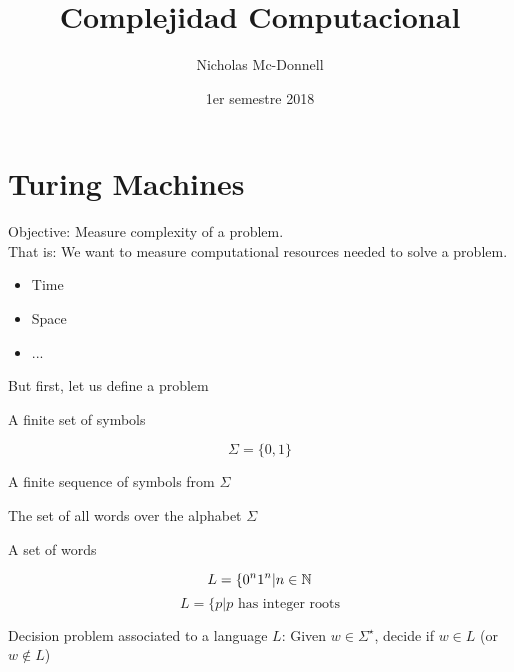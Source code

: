 

\title{Complejidad Computacional}
\author{Nicholas Mc-Donnell}
\date{1er semestre 2018}



    \maketitle

    \tableofcontents


    \chapter{Turing Machines}

    Objective: Measure complexity of a problem.\\

    That is: We want to measure computational resources needed to solve a problem.
    \begin{itemize}
        \item Time

        \item Space

        \item ...
    \end{itemize}

    But first, let us define a problem
    \begin{defn}
        A finite set of symbols
    \end{defn}
    \begin{ejm}
        \[\Sigma=\{0,1\}\]
    \end{ejm}
    \begin{defn}[Word $w$]
        A finite sequence of symbols from $\Sigma$
    \end{defn}
    \begin{defn}[$\Sigma^\star$]
        The set of all words over the alphabet $\Sigma$
    \end{defn}
    \begin{defn}[Language $L$]
        A set of words
    \end{defn}
    \begin{ejm}
        \[L=\{0^n1^n|n\in\mathbb{N}\]
        \[L=\{p|p\text{ has integer roots}\]
    \end{ejm}
    Decision problem associated to a language $L$: Given $w\in\Sigma^\star$, decide if $w\in L$ (or $w\notin L$)\\

